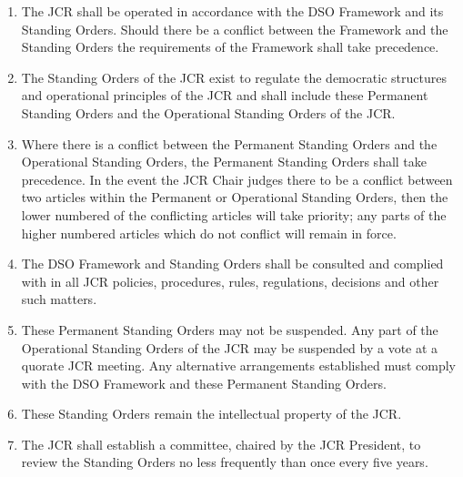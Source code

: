 \begin{enumerate}
    \item The JCR shall be operated in accordance with the DSO Framework and its Standing Orders. Should there be a conflict between the Framework and the Standing Orders the requirements of the Framework shall take precedence.
    \item The Standing Orders of the JCR exist to regulate the democratic structures and operational principles of the JCR and shall include these Permanent Standing Orders and the Operational Standing Orders of the JCR.
    \item Where there is a conflict between the Permanent Standing Orders and the Operational Standing Orders, the Permanent Standing Orders shall take precedence. In the event the JCR Chair judges there to be a conflict between two articles within the Permanent or Operational Standing Orders, then the lower numbered of the conflicting articles will take priority; any parts of the higher numbered articles which do not conflict will remain in force.
    \item The DSO Framework and Standing Orders shall be consulted and complied with in all JCR policies, procedures, rules, regulations, decisions and other such matters.
    \item  These Permanent Standing Orders may not be suspended. Any part of the Operational Standing Orders of the JCR may be suspended by a vote at a quorate JCR meeting. Any alternative arrangements established must comply with the DSO Framework and these Permanent Standing Orders.
    \item These Standing Orders remain the intellectual property of the JCR.
    \item The JCR shall establish a committee, chaired by the JCR President, to review the Standing Orders no less frequently than once every five years.
\end{enumerate}


